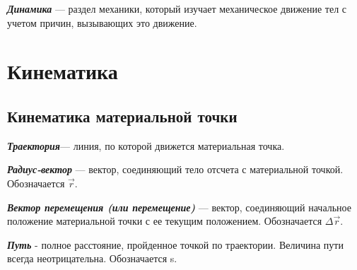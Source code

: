 \vspace{5px}

 \textbf{\textit{Динамика}} --- раздел механики, который изучает механическое движение тел с учетом причин, вызывающих это движение.

\vspace{3px}

\section{Кинематика}
\subsection{Кинематика материальной точки}
 \textbf{\textit{Траектория}}--- линия, по которой движется материальная точка.

\vspace{5px}

 \textbf{\textit{Радиус-вектор}} --- вектор, соединяющий тело отсчета с материальной точкой. Обозначается $\vec r$.

\vspace{5px}

 \textbf{\textit{Вектор перемещения (или перемещение)}} --- вектор, соединяющий начальное положение материальной точки с ее текущим положением. Обозначается $\Delta \vec r$.

\vspace{5px}

 \textbf{\textit{Путь}} - полное расстояние, пройденное точкой по траектории. Величина пути всегда неотрицательна. Обозначается s.

\vspace{5px}

